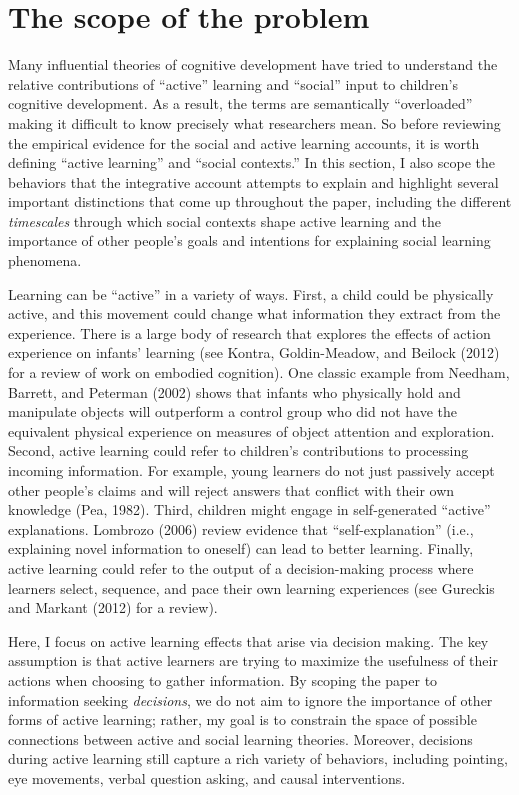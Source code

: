 \documentclass[english,floatsintext,man]{apa6}
\theoremstyle{definition}
\theoremstyle{definition}
\theoremstyle{definition}
\theoremstyle{remark}
\begin{document}
\section{The scope of the problem}\label{the-scope-of-the-problem}

Many influential theories of cognitive development have tried to
understand the relative contributions of \enquote{active} learning and
\enquote{social} input to children's cognitive development. As a result,
the terms are semantically \enquote{overloaded} making it difficult to
know precisely what researchers mean. So before reviewing the empirical
evidence for the social and active learning accounts, it is worth
defining \enquote{active learning} and \enquote{social contexts.} In
this section, I also scope the behaviors that the integrative account
attempts to explain and highlight several important distinctions that
come up throughout the paper, including the different \emph{timescales}
through which social contexts shape active learning and the importance
of other people's goals and intentions for explaining social learning
phenomena.

Learning can be \enquote{active} in a variety of ways. First, a child
could be physically active, and this movement could change what
information they extract from the experience. There is a large body of
research that explores the effects of action experience on infants'
learning (see Kontra, Goldin-Meadow, and Beilock (2012) for a review of
work on embodied cognition). One classic example from Needham, Barrett,
and Peterman (2002) shows that infants who physically hold and
manipulate objects will outperform a control group who did not have the
equivalent physical experience on measures of object attention and
exploration. Second, active learning could refer to children's
contributions to processing incoming information. For example, young
learners do not just passively accept other people's claims and will
reject answers that conflict with their own knowledge (Pea, 1982).
Third, children might engage in self-generated \enquote{active}
explanations. Lombrozo (2006) review evidence that
\enquote{self-explanation} (i.e., explaining novel information to
oneself) can lead to better learning. Finally, active learning could
refer to the output of a decision-making process where learners select,
sequence, and pace their own learning experiences (see Gureckis and
Markant (2012) for a review).

Here, I focus on active learning effects that arise via decision making.
The key assumption is that active learners are trying to maximize the
usefulness of their actions when choosing to gather information. By
scoping the paper to information seeking \emph{decisions}, we do not aim
to ignore the importance of other forms of active learning; rather, my
goal is to constrain the space of possible connections between active
and social learning theories. Moreover, decisions during active learning
still capture a rich variety of behaviors, including pointing, eye
movements, verbal question asking, and causal interventions.
\end{document}

